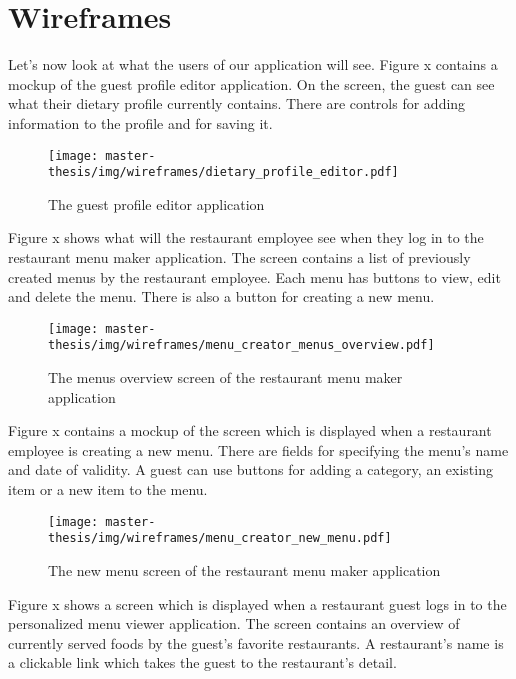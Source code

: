 \section{Wireframes}
Let's now look at what the users of our application will see.
Figure x contains a mockup of the guest profile editor application.
On the screen, the guest can see what their dietary profile currently contains.
There are controls for adding information to the profile and for saving it.

\begin{figure}[h]
  \centering
  \texttt{[image: master-thesis/img/wireframes/dietary\_profile\_editor.pdf]}
  \caption{The guest profile editor application}
\end{figure}

Figure x shows what will the restaurant employee see when they log in to the restaurant menu maker application.
The screen contains a list of previously created menus by the restaurant employee.
Each menu has buttons to view, edit and delete the menu.
There is also a button for creating a new menu.

\begin{figure}[h]
  \centering
  \texttt{[image: master-thesis/img/wireframes/menu\_creator\_menus\_overview.pdf]}
  \caption{The menus overview screen of the restaurant menu maker application}
\end{figure}

Figure x contains a mockup of the screen which is displayed when a restaurant employee is creating a new menu.
There are fields for specifying the menu's name and date of validity.
A guest can use buttons for adding a category, an existing item or a new item to the menu.

\begin{figure}[h]
  \centering
  \texttt{[image: master-thesis/img/wireframes/menu\_creator\_new\_menu.pdf]}
  \caption{The new menu screen of the restaurant menu maker application}
\end{figure}

Figure x shows a screen which is displayed when a restaurant guest logs in to the personalized menu viewer application.
The screen contains an overview of currently served foods by the guest's favorite restaurants.
A restaurant's name is a clickable link which takes the guest to the restaurant's detail.

